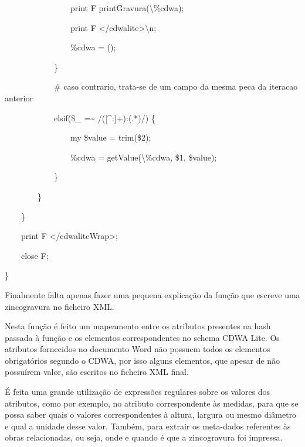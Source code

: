 \documentclass[letterpaper]{article}
\begin{document}
{
\ \ \ \ \ \ \ \ \ \ \ \ \ \ \ \ print F
printGravura({\textbackslash}\%cdwa); }

{
\ \ \ \ \ \ \ \ \ \ \ \ \ \ \ \ print F
{\textquotedbl}{\textless}/cdwalite{\textgreater}{\textbackslash}n{\textquotedbl};
}

{
\ \ \ \ \ \ \ \ \ \ \ \ \ \ \ \ \%cdwa = (); }

{
\ \ \ \ \ \ \ \ \ \ \ \ \} }

{
\ \ \ \ \ \ \ \ \ \ \ \ \# caso contrario, trata-se de um campo da mesma
peca da iteracao anterior }

{
\ \ \ \ \ \ \ \ \ \ \ \ elsif(\$\_ =\~{} /([\^{}:]+):(.*)/) \{ }

{
\ \ \ \ \ \ \ \ \ \ \ \ \ \ \ \ my \$value = trim(\$2); }

{
\ \ \ \ \ \ \ \ \ \ \ \ \ \ \ \ \%cdwa =
getValue({\textbackslash}\%cdwa, \$1, \$value); }

{
\ \ \ \ \ \ \ \ \ \ \ \ \} }

{
\ \ \ \ \ \ \ \ \} }

{
\ \ \ \ \} }

{
\ \ \ \ print F
{\textquotedbl}{\textless}/cdwaliteWrap{\textgreater}{\textquotedbl}; }

{
\ \ \ \ close F; }

{
\}}


\bigskip

{
Finalmente falta apenas fazer uma pequena explica\c{c}\~ao da
fun\c{c}\~ao que escreve uma zincogravura no ficheiro XML. }

{
Nesta fun\c{c}\~ao \'e feito um mapeamento entre os atributos presentes
na hash passada \`a fun\c{c}\~ao e os elementos correspondentes no
schema CDWA Lite. Os atributos fornecidos no documento Word n\~ao
possuem todos os elementos obrigat\'orios segundo o CDWA, por isso
alguns elementos, que apesar de n\~ao possu\'irem valor, s\~ao escritos
no ficheiro XML final.}

{
\'E feita uma grande utiliza\c{c}\~ao de express\~oes regulares sobre os
valores dos atributos, como por exemplo, no atributo correspondente
\`as medidas, para que se possa saber quais o valores correspondentes
\`a altura, largura ou mesmo di\^ametro e qual a unidade desse valor.
Tamb\'em, para extrair os meta-dados referentes \`as obras
relacionadas, ou seja, onde e quando \'e que a zincogravura foi
impressa.}
\end{document}
